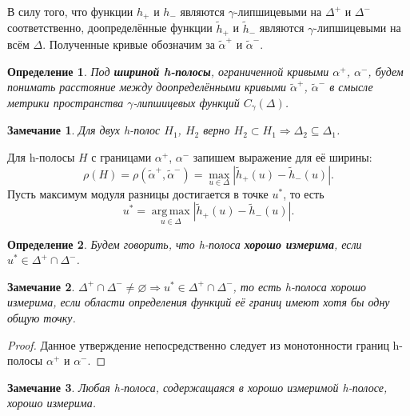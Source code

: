\documentclass{article}
\newtheorem*{definition}{Определение}
\newtheorem{remark}{Замечание}
\DeclareMathOperator*{\argmax}{arg\,max}
\begin{document}
В силу того, что функции $h_+$ и $h_-$ являются $\gamma$-липшицевыми на $\Delta^+$ и $\Delta^-$ соответственно, доопределённые функции $\widetilde{h}_+$ и $\widetilde{h}_-$ являются $\gamma$-липшицевыми на всём $\Delta$.
Полученные кривые обозначим за $\widetilde{\alpha}^+$ и $\widetilde{\alpha}^-$.

\begin{definition}
	Под {\bf шириной h-полосы}, ограниченной кривыми $\alpha^+$, $\alpha^-$, будем понимать расстояние между доопределёнными кривыми $\widetilde{\alpha}^+$, $\widetilde{\alpha}^-$ в смысле метрики пространства $\gamma$-липшицевых функций $C_{\gamma}(\Delta)$.
\end{definition}

\begin{remark}
 	Для двух h-полос $H_1$, $H_2$ верно $H_2 \subset H_1 \Rightarrow \Delta_2 \subseteq \Delta_1$.
\label{rem:h-strips}
\end{remark}

Для h-полосы $H$ с границами $\alpha^+$, $\alpha^-$ запишем выражение для её ширины:
\begin{equation}
	\rho(H) = \rho(\widetilde{\alpha}^+, \widetilde{\alpha}^-) = \max \limits_{u \in \Delta} |\widetilde{h}_+(u) - \widetilde{h}_-(u)|.
\label{eq:width-h-strip}
\end{equation}
Пусть максимум модуля разницы достигается в точке $u^*$, то есть
\begin{equation}
	u^* = \argmax \limits_{u \in \Delta} |\widetilde{h}_+(u) - \widetilde{h}_-(u)|.
\label{eq:argmax}
\end{equation}

\begin{definition}
	Будем говорить, что \emph{h}-полоса {\bf хорошо измерима}, если $u^* \in \Delta^+ \cap \Delta^-$.	
\end{definition}

\begin{remark}
	$\Delta^+ \cap \Delta^- \neq \varnothing \Rightarrow u^* \in \Delta^+ \cap \Delta^-$, то есть \emph{h}-полоса хорошо измерима, если области определения функций её границ имеют хотя бы одну общую точку. 
\end{remark}
\begin{proof}
	Данное утверждение непосредственно следует из монотонности границ h-полосы $\alpha^+$ и $\alpha^-$.
\end{proof}

\begin{remark}
	Любая \emph{h}-полоса, содержащаяся в хорошо измеримой \emph{h}-полосе, хорошо измерима.
\label{rem:well-h-strip}
\end{remark}
\end{document}
